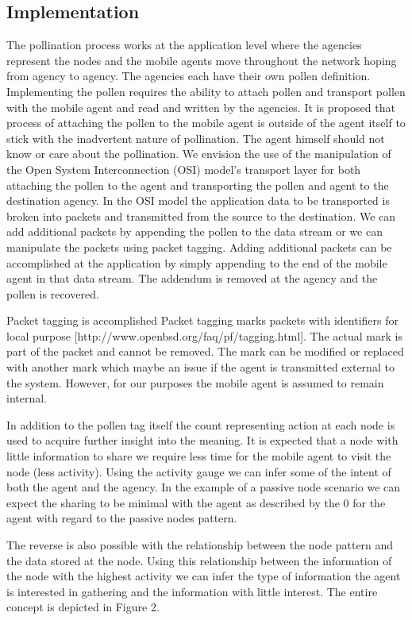 \documentclass{acm_proc_article-sp}
\begin{document}
\subsection{Implementation}
The pollination process works at the application level where the agencies represent the nodes and the mobile agents move throughout the network hoping from agency to agency. The agencies each have their own pollen definition. Implementing the pollen requires the ability to attach pollen and transport pollen with the mobile agent and read and written by the agencies.  It is proposed that process of attaching the pollen to the mobile agent is outside of the agent itself to stick with the inadvertent nature of pollination. The agent himself should not know or care about the pollination. We envision the use of the manipulation of the Open System Interconnection (OSI) model's transport layer for both attaching the pollen to the agent and transporting the pollen and agent to the destination agency. In the OSI model the application data to be transported is broken into packets and transmitted from the source to the destination. We can add additional packets by appending the pollen to the data stream or we can manipulate the packets using packet tagging. Adding additional packets can be accomplished at the application by simply appending to the end of the mobile agent in that data stream. The addendum is removed at the agency and the pollen is recovered.

Packet tagging is accomplished Packet tagging marks packets with identifiers for local purpose [http://www.openbsd.org/faq/pf/tagging.html]. The actual mark is part of the packet and cannot be removed. The mark can be modified or replaced with another mark which maybe an issue if the agent is transmitted external to the system. However, for our purposes the mobile agent is assumed to remain internal.

In addition to the pollen tag itself the count representing action at each node is used to acquire further insight into the meaning. It is expected that a node with little information to share we require less time for the mobile agent to visit the node (less activity). Using the activity gauge we can infer some of the intent of both the agent and the agency.  In the example of a passive node scenario we can expect the sharing to be minimal with the agent as described by the 0 for the agent with regard to the passive nodes pattern.

The reverse is also possible with the relationship between the node pattern and the data stored at the node. Using this relationship between the information of the node with the highest activity we can infer the type of information the agent is interested in gathering and the information with little interest.  The entire concept is depicted in Figure 2.
\end{document}
